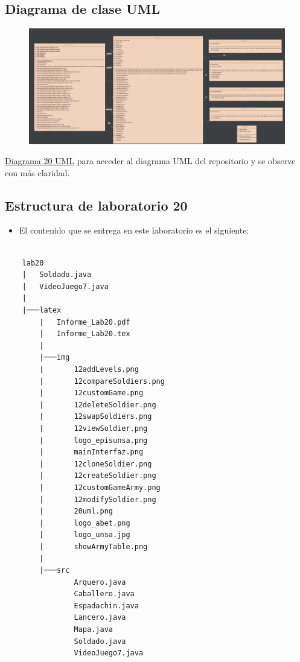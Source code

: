 \documentclass{article}
\newcommand{\itemPracticeNumber}{20}
\begin{document}
\newpage

\subsection{Diagrama de clase UML}
\begin{figure}[H]
    \centering
    \includegraphics[width=1.1
    \textwidth,keepaspectratio]{img/20uml.png}
    \caption{}
\end{figure}

\href{https://github.com/hernanchoquehuanca/fp2-23b/blob/main/fase03/lab20/latex/img/20uml.png}{Diagrama 20 UML} para acceder al diagrama UML del repositorio y se observe con más claridad.


\newpage

\subsection{Estructura de laboratorio \itemPracticeNumber} %
\begin{itemize}	
	\item El contenido que se entrega en este laboratorio es el siguiente:
\end{itemize}


\begin{lstlisting}[style=ascii-tree]

    lab20
    |   Soldado.java
    |   VideoJuego7.java
    |
    |───latex
        |   Informe_Lab20.pdf
        |   Informe_Lab20.tex
        |
        |───img
        |       12addLevels.png     
        |       12compareSoldiers.png  
        |       12customGame.png      
        |       12deleteSoldier.png  
        |       12swapSoldiers.png  
        |       12viewSoldier.png  
        |       logo_episunsa.png  
        |       mainInterfaz.png
        |       12cloneSoldier.png  
        |       12createSoldier.png    
        |       12customGameArmy.png  
        |       12modifySoldier.png  
        |       20uml.png           
        |       logo_abet.png      
        |       logo_unsa.jpg      
        |       showArmyTable.png
        |
        |───src
                Arquero.java
                Caballero.java
                Espadachin.java
                Lancero.java
                Mapa.java
                Soldado.java
                VideoJuego7.java

\end{lstlisting}    
\end{document}

